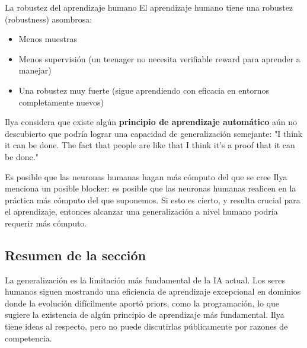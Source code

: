 \begin{importantbox}{La robustez del aprendizaje humano}
El aprendizaje humano tiene una robustez (robustness) asombrosa:
\begin{itemize}
    \item Menos muestras
    \item Menos supervisión (un teenager no necesita verifiable reward para aprender a manejar)
    \item Una robustez muy fuerte (sigue aprendiendo con eficacia en entornos completamente nuevos)
\end{itemize}
Ilya considera que existe algún \textbf{principio de aprendizaje automático} aún no descubierto que podría lograr una capacidad de generalización semejante: "I think it can be done. The fact that people are like that I think it's a proof that it can be done."
\end{importantbox}

\begin{knowledgebox}{Es posible que las neuronas humanas hagan más cómputo del que se cree}
Ilya menciona un posible blocker: es posible que las neuronas humanas realicen en la práctica más cómputo del que suponemos. Si esto es cierto, y resulta crucial para el aprendizaje, entonces alcanzar una generalización a nivel humano podría requerir más cómputo.
\end{knowledgebox}

\subsection{Resumen de la sección}

La generalización es la limitación más fundamental de la IA actual. Los seres humanos siguen mostrando una eficiencia de aprendizaje excepcional en dominios donde la evolución difícilmente aportó priors, como la programación, lo que sugiere la existencia de algún principio de aprendizaje más fundamental. Ilya tiene ideas al respecto, pero no puede discutirlas públicamente por razones de competencia.


